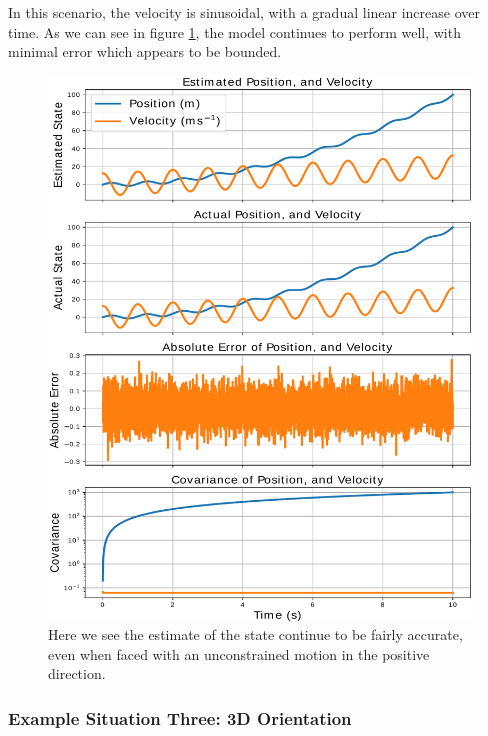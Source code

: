 \documentclass[12pt]{article}
\begin{document}
In this scenario, the velocity is sinusoidal, with a gradual linear increase over time. As we can see in figure \ref{1d_velocity_fig}, the model continues to perform well, with minimal error which appears to be bounded.

\begin{figure}[thp]
	\centering
	
	\includegraphics[width=\textwidth]{1d-velocity.pdf}
	
	\caption{Here we see the estimate of the state continue to be fairly accurate, even when faced with an unconstrained motion in the positive direction.}
	\label{1d_velocity_fig}
\end{figure}

\subsubsection{Example Situation Three: 3D Orientation}
\end{document}
